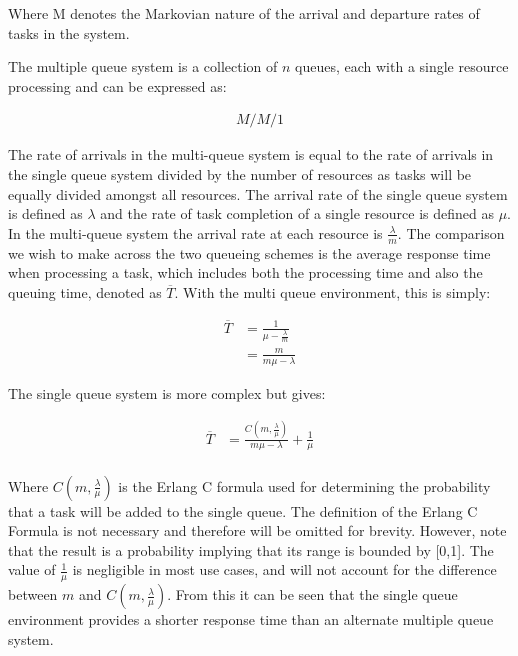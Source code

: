 \documentclass[12pt]{article}
\begin{document}
Where M denotes the Markovian nature of the arrival and departure rates of tasks in the system.

The multiple queue system is a collection of $n$ queues, each with a single resource processing and can be expressed as:

\begin{align*}
M / M / 1
\end{align*}

The rate of arrivals in the multi-queue system is equal to the rate of arrivals in the single queue system divided by the number of resources as tasks will be equally divided amongst all resources. The arrival rate of the single queue system is defined as $\lambda$ and the rate of task completion of a single resource is defined as $\mu$. In the multi-queue system the arrival rate at each resource is $\frac{\lambda}{m}$.
\newline
\newline
The comparison we wish to make across the two queueing schemes is the average response time when processing a task, which includes both the processing time and also the queuing time, denoted as $\overline{T}$. With the multi queue environment, this is simply:

\begin{align*}
\overline{T} &= \frac{1}{\mu - \frac{\lambda}{m}} \\
                   &= \frac{m}{m\mu - \lambda}
\end{align*}

The single queue system is more complex but gives:

\begin{align*}
\overline{T} &= \frac{C(m, \frac{\lambda}{\mu})}{m\mu - \lambda} + \frac{1}{\mu} \\
\end{align*}

Where $C(m, \frac{\lambda}{\mu})$ is the Erlang C formula \cite{erlang} used for determining the probability that a task will be added to the single queue. The definition of the Erlang C Formula is not necessary and therefore will be omitted for brevity. However, note that the result is a probability implying that its range is bounded by [0,1]. The value of $\frac{1}{\mu}$ is negligible in most use cases, and will not account for the difference between $m$ and $C(m, \frac{\lambda}{\mu})$. From this it can be seen that the single queue environment provides a shorter response time than an alternate multiple queue system.
\end{document}
